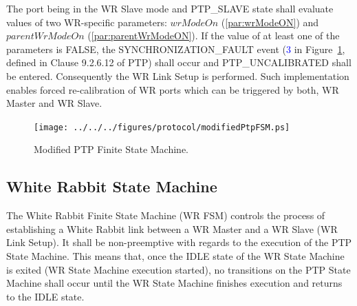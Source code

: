 \documentclass[a4paper, 12pt]{article}
\begin{document}
The port being in the WR Slave mode and PTP\_SLAVE state shall evaluate values of two WR-specific 
parameters: $wrModeOn$ (\ref{par:wrModeON}) and $parentWrModeOn$ (\ref{par:parentWrModeON}). 
If the value of at least one of the parameters is FALSE, the SYNCHRONIZATION\_FAULT event 
(\textcolor{blue}{3} in Figure~\ref{fig:modifiedPtpFSM}, defined in Clause 9.2.6.12 of PTP) shall 
occur and PTP\_UNCALIBRATED shall be entered. Consequently the WR Link Setup is performed. 
Such implementation enables forced re-calibration of WR ports which can be triggered by both, 
WR Master and WR Slave.

 

% 

\newpage

\begin{figure}[ht!]
  \centering
  \texttt{[image: ../../../figures/protocol/modifiedPtpFSM.ps]}
  \caption{Modified PTP Finite State Machine.}
  \label{fig:modifiedPtpFSM}
\end{figure}



\newpage

\subsection{White Rabbit State Machine}
\label{wrFSM}

The White Rabbit Finite State Machine (WR FSM) controls the process of establishing a White Rabbit 
link between a WR Master and a WR Slave (WR Link Setup). It shall be non-preemptive with regards 
to the execution of the PTP State Machine. This means that, once the IDLE state of the WR State Machine is 
exited (WR State Machine execution started), no transitions on the PTP State Machine shall occur 
until the WR State Machine finishes execution and returns to the IDLE state. 
\end{document}
